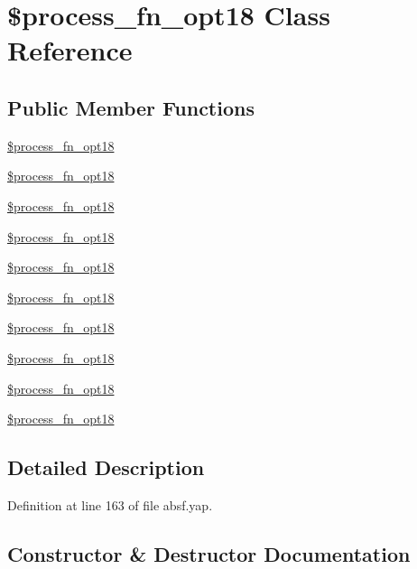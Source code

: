 \section{\$process\+\_\+fn\+\_\+opt18 Class Reference}
\label{class_0Bprocess__fn__opt18}
\subsection*{Public Member Functions}
\begin{DoxyCompactItemize}
\item 
\hyperlink{class_0Bprocess__fn__opt18_a9bee7b3e8301e1fc36c4b220c0d11ce7}{\$process\+\_\+fn\+\_\+opt18}
\item 
\hyperlink{class_0Bprocess__fn__opt18_a9bee7b3e8301e1fc36c4b220c0d11ce7}{\$process\+\_\+fn\+\_\+opt18}
\item 
\hyperlink{class_0Bprocess__fn__opt18_a9bee7b3e8301e1fc36c4b220c0d11ce7}{\$process\+\_\+fn\+\_\+opt18}
\item 
\hyperlink{class_0Bprocess__fn__opt18_a9bee7b3e8301e1fc36c4b220c0d11ce7}{\$process\+\_\+fn\+\_\+opt18}
\item 
\hyperlink{class_0Bprocess__fn__opt18_a9bee7b3e8301e1fc36c4b220c0d11ce7}{\$process\+\_\+fn\+\_\+opt18}
\item 
\hyperlink{class_0Bprocess__fn__opt18_a9bee7b3e8301e1fc36c4b220c0d11ce7}{\$process\+\_\+fn\+\_\+opt18}
\item 
\hyperlink{class_0Bprocess__fn__opt18_a9bee7b3e8301e1fc36c4b220c0d11ce7}{\$process\+\_\+fn\+\_\+opt18}
\item 
\hyperlink{class_0Bprocess__fn__opt18_a9bee7b3e8301e1fc36c4b220c0d11ce7}{\$process\+\_\+fn\+\_\+opt18}
\item 
\hyperlink{class_0Bprocess__fn__opt18_a9bee7b3e8301e1fc36c4b220c0d11ce7}{\$process\+\_\+fn\+\_\+opt18}
\item 
\hyperlink{class_0Bprocess__fn__opt18_a9bee7b3e8301e1fc36c4b220c0d11ce7}{\$process\+\_\+fn\+\_\+opt18}
\end{DoxyCompactItemize}


\subsection{Detailed Description}


Definition at line 163 of file absf.\+yap.



\subsection{Constructor \& Destructor Documentation}
